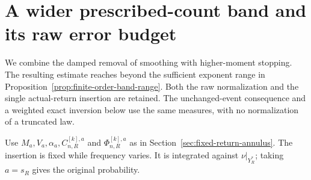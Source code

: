 \section{A wider prescribed-count band and its raw error budget}
\label{sec:wider-fixed-count-band}
We combine the damped removal of smoothing with higher-moment stopping.
The resulting estimate reaches beyond the sufficient exponent range
in Proposition~\ref{prop:finite-order-band-range}. Both the raw
normalization and the single actual-return insertion are retained.
The unchanged-event consequence and a weighted exact inversion below
use the same measures, with no normalization of a truncated law.

Use $M_a,V_a,\alpha_a,C^{[k],a}_{n,R}$ and
$\Phi^{[k],a}_{n,R}$ as in Section~\ref{sec:fixed-return-annulus}.
The insertion is fixed while frequency varies. It is integrated
against $\nu|_{Y_R^*}$; taking $a=s_R$ gives the original probability.

